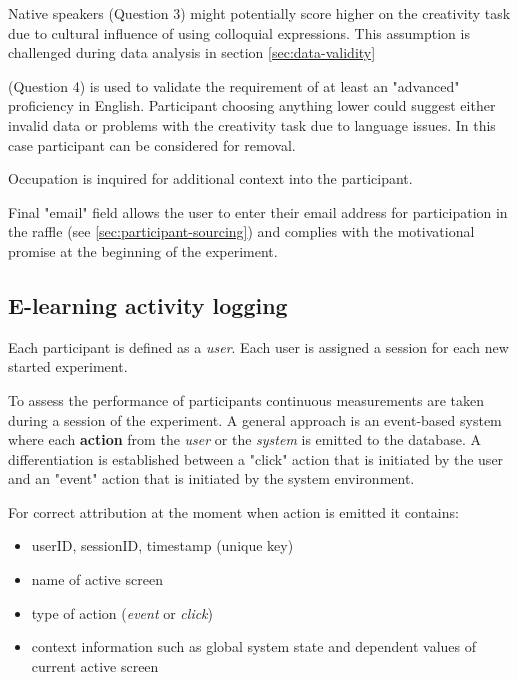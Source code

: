 	
	Native speakers (Question 3) might potentially score higher on the creativity task due to cultural influence of using colloquial expressions. This assumption is challenged during data analysis in section \ref{sec:data-validity}
	
	(Question 4) is used to validate the requirement of at least an "advanced" proficiency in English. Participant choosing anything lower could suggest either invalid data or problems with the creativity task due to language issues. In this case participant can be considered for removal.
	
	Occupation is inquired for additional context into the participant.
	
	Final "email" field allows the user to enter their email address for participation in the raffle (see \ref{sec:participant-sourcing}) and complies with the motivational promise at the beginning of the experiment.

	\subsection{E-learning activity logging} \label{sec:activitylog}
	
	Each participant is defined as a \textit{user}. Each user is assigned a session for each new started experiment. 
	
	To assess the performance of participants continuous measurements are taken during a session of the experiment. A general approach is an event-based system where each \textbf{action} from the \textit{user} or the \textit{system} is emitted to the database. A differentiation is established between a "click" action that is initiated by the user and an "event" action that is initiated by the system environment.
	
	For correct attribution at the moment when action is emitted it contains: 
	\begin{itemize}
		\item userID, sessionID, timestamp (unique key)
		\item name of active screen
		\item type of action (\textit{event} or \textit{click})
		\item context information such as global system state and dependent values of current active screen
	\end{itemize}

